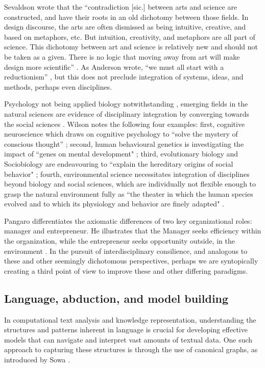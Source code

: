Sevaldson wrote that the ``contradiction [sic.] between arts and science are constructed, and have their roots in an old dichotomy between those fields. In design discourse, the arts are often dismissed as being intuitive, creative, and based on metaphors, etc. But intuition, creativity, and metaphors are all part of science. This dichotomy between art and science is relatively new and should not be taken as a given. There is no logic that moving away from art will make design more scientific” \citep[p. 159]{sevaldson_designing_2022}. As Anderson wrote, ``we must all start with a reductionism” \citep[p. 394]{anderson_more_1972}, but this does not preclude integration of systems, ideas, and methods, perhaps even disciplines. 

Psychology not being applied biology notwithstanding \citep[p. 393]{anderson_more_1972}, emerging fields in the natural sciences are evidence of disciplinary integration by converging towards the social sciences \citep[p. 208]{wilson_consilience_1999}. Wilson notes the following four examples: first, cognitive neuroscience which draws on cognitive psychology to “solve the mystery of conscious thought” \citep[p. 208-209]{wilson_consilience_1999}; second, human behavioural genetics is investigating the impact of ``genes on mental development" \citep[p. 209]{wilson_consilience_1999}; third, evolutionary biology and Sociobiology are endeavouring to ``explain the hereditary origins of social behavior" \citep[p. 209]{wilson_consilience_1999}; fourth, environmental science necessitates integration of disciplines beyond biology and social sciences, which are individually not flexible enough to grasp the natural environment fully as ``the theater in which the human species evolved and to which its physiology and behavior are finely adapted" \citep[p. 209]{wilson_consilience_1999}. 

Pangaro differentiates the axiomatic differences of two key organizational roles: manager and entrepreneur. He illustrates that the Manager seeks efficiency within the organization, while the entrepreneur seeks opportunity outside, in the environment \citep[p. 142-149]{pangaro_design_2011}. In the pursuit of interdisciplinary consilience, and analogous to these and other seemingly dichotomous perspectives, perhaps we are syntopically creating a third point of view to improve these and other differing paradigms. 
\subsection{Language, abduction, and model building}
In computational text analysis and knowledge representation, understanding the structures and patterns inherent in language is crucial for developing effective models that can navigate and interpret vast amounts of textual data. One such approach to capturing these structures is through the use of canonical graphs, as introduced by Sowa \citep[p. 53]{sowa_semantics_2013}.


